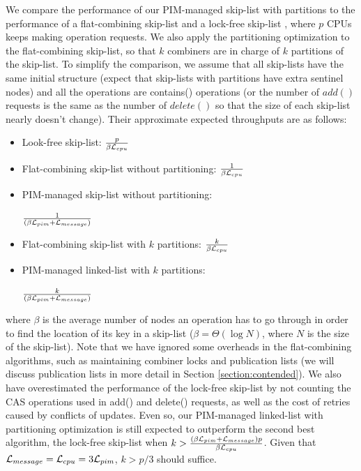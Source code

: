 We compare the performance of our PIM-managed skip-list with partitions 
to the performance of a flat-combining skip-list \cite{Hendler10}
and a lock-free skip-list \cite{Herlihy08}, 
where $p$ CPUs keeps making operation requests.
We also apply the partitioning optimization to the flat-combining skip-list, 
so that $k$ combiners are in charge of $k$ partitions of the skip-list. 
To simplify the comparison, we assume that all skip-lists have the same
initial structure (expect that skip-lists with partitions have extra sentinel nodes)
and all the operations are contains() operations
(or the number of $add()$ requests is the same as the number of $delete()$ 
so that the size of each skip-list nearly doesn't change).
Their approximate expected throughputs are as follows:
\begin{itemize}
\item Look-free skip-list:
	${p \over \beta\mathcal{L}_{cpu}}$

\item Flat-combining skip-list without partitioning:
	${1 \over \beta\mathcal{L}_{cpu}}$

\item PIM-managed skip-list without partitioning:

	${1 \over (\beta\mathcal{L}_{pim} + \mathcal{L}_{message})}$

\item Flat-combining skip-list with $k$ partitions:
    ${k \over \beta\mathcal{L}_{cpu}}$

\item PIM-managed linked-list with $k$ partitions:

    ${k \over (\beta\mathcal{L}_{pim} + \mathcal{L}_{message})}$
\end{itemize}
where $\beta$ is the average number of nodes an operation has to go through
in order to find the location of its key in a skip-list
($\beta = \Theta(\log N)$, where $N$ is the size of the skip-list).
Note that we have ignored some overheads in the flat-combining
algorithms, such as maintaining combiner locks and publication lists
(we will discuss publication lists in more detail in Section \ref{section:contended}).
We also have overestimated the performance of the lock-free skip-list by not counting the
CAS operations used in add() and delete() requests, as well as the cost of retries
caused by conflicts of updates.
Even so, our PIM-managed linked-list with partitioning optimization is
still expected to outperform the second best algorithm, the lock-free skip-list 
when $k > {(\beta\mathcal{L}_{pim} + \mathcal{L}_{message})p \over \beta\mathcal{L}_{cpu}}$.
Given that $\mathcal{L}_{message} = \mathcal{L}_{cpu} = 3\mathcal{L}_{pim}$, $k > p/3$ should suffice.

